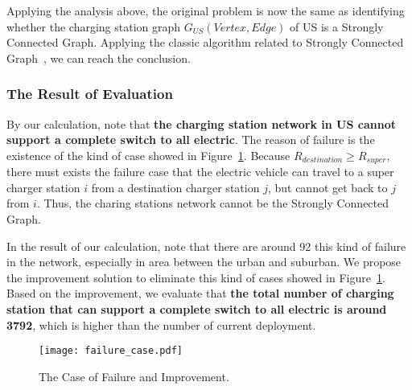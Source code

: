 Applying the analysis above,
the original problem is now the same as identifying whether the charging station graph $G_{US}(Vertex, Edge)$ of US is a Strongly Connected Graph.
Applying the classic algorithm related to Strongly Connected Graph~\cite{connectivity_algo},
we can reach the conclusion.
\subsubsection{The Result of Evaluation}
By our calculation, note that \textbf{the charging station network in US cannot support a complete switch to all electric}.
The reason of failure is the existence of the kind of case showed in Figure~\ref{fig_failure_case}.
Because $R_{destination} \geq R_{super}$,
there must exists the failure case that the electric vehicle can travel to a super charger station $i$ from a destination charger station $j$, but cannot get back to $j$ from $i$.
Thus, the charing stations network cannot be the Strongly Connected Graph.

In the result of our calculation,
note that there are around 92 this kind of failure in the network,
especially in area between the urban and suburban.
We propose the improvement solution to eliminate this kind of cases showed in Figure~\ref{fig_failure_case}.
Based on the improvement,
we evaluate that \textbf{the total number of charging station that can support a complete switch to all electric is around 3792},
which is higher than the number of current deployment.

\begin{figure}[!t]
\centering
\texttt{[image: failure\_case.pdf]}
\caption{The Case of Failure and Improvement.}
\label{fig_failure_case}
\end{figure}
